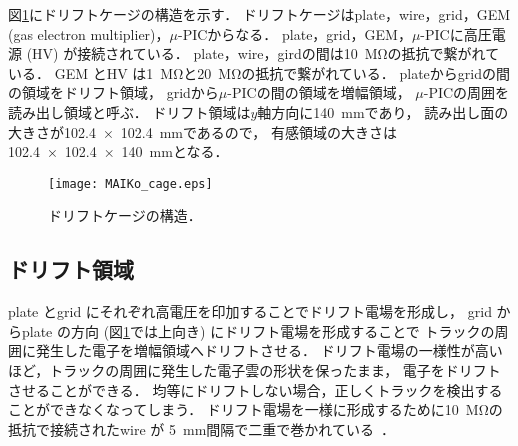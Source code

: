 \documentclass[../master]{subfiles}
\begin{document}

図\ref{fig::MAIKo_cage}にドリフトケージの構造を示す．
ドリフトケージはplate，wire，grid，GEM (gas electron multiplier)，$\mu$-PICからなる．
plate，grid，GEM，$\mu$-PICに高圧電源 (HV) が接続されている．
plate，wire，girdの間は\SI{10}{\mega\ohm}の抵抗で繋がれている．
GEM とHV は\SI{1}{\mega\ohm}と\SI{20}{\mega\ohm}の抵抗で繋がれている．
plateからgridの間の領域をドリフト領域，
gridから$\mu$-PICの間の領域を増幅領域，
$\mu$-PICの周囲を読み出し領域と呼ぶ．
ドリフト領域は$y$軸方向に\SI{140}{\milli\metre}であり，
読み出し面の大きさが\SI{102.4x102.4}{\milli\metre}であるので，
有感領域の大きさは\SI{102.4x102.4x140}{\milli\metre}となる．
\begin{figure}
  \centering
  \texttt{[image: MAIKo\_cage.eps]}
  \caption{ドリフトケージの構造．}
  \label{fig::MAIKo_cage}
\end{figure}


\subsection{ドリフト領域}
plate とgrid にそれぞれ高電圧を印加することでドリフト電場を形成し，
grid からplate の方向 (図\ref{fig::MAIKo_cage}では上向き) にドリフト電場を形成することで
トラックの周囲に発生した電子を増幅領域へドリフトさせる．
ドリフト電場の一様性が高いほど，トラックの周囲に発生した電子雲の形状を保ったまま，
電子をドリフトさせることができる．
均等にドリフトしない場合，正しくトラックを検出することができなくなってしまう．
ドリフト電場を一様に形成するために\SI{10}{\mega\ohm}の抵抗で接続されたwire が
\SI{5}{\milli\metre}間隔で二重で巻かれている~\cite{furuno}．
\end{document}
